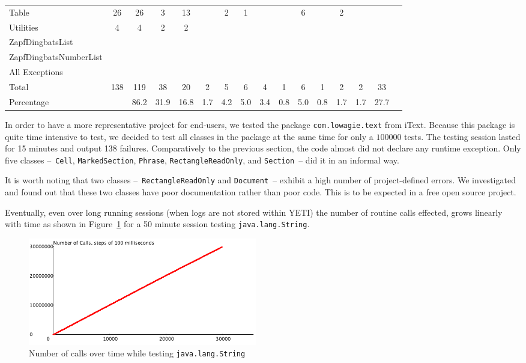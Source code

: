 \begin{table}[h!]
\begin{center}
\begin{tabular}{l c c c c c c c c c c c c c c c}
Table &26&26&3&13&&2&1&&&6&&2&&\\
Utilities &4&4&2&2&&&&&&&&&&\\
ZapfDingbatsList &&&&&&&&&&&&&&\\
ZapfDingbatsNumberList&&&&&&&&&&&&&&\\
All Exceptions&&&&&&&&&&&&&&\\
\hline
Total&138&119&38&20&2&5&6&4&1&6&1&2&2&33\\
\hline
Percentage&&86.2&31.9&16.8&1.7&4.2&5.0&3.4&0.8&5.0&0.8&1.7&1.7&27.7\\
\hline
\end{tabular}
\end{center}
\end{table}

In order to have a more representative project for end-users, we tested the package \texttt{com.lowagie.text} from iText. Because this package is quite time intensive to test, we decided to test all classes in the package at the same time for only a $100000$ tests. The testing session lasted for 15 minutes and output 138 failures. Comparatively to the previous section, the code almost did not declare any runtime exception. Only five classes --~\texttt{Cell}, \texttt{MarkedSection}, \texttt{Phrase}, \texttt{RectangleReadOnly}, and \texttt{Section}~-- did it in an informal way. 

It is worth noting that two classes --~\texttt{RectangleReadOnly}  and \texttt{Document}~-- exhibit a high number of project-defined errors. We investigated and found out that these two classes have poor documentation rather than poor code. This is to be expected in a free open source project.

Eventually, even over long running sessions (when logs are not stored within YETI) the number of routine calls effected, grows linearly with time as shown in Figure~\ref{fig:string} for a 50 minute session testing \texttt{java.lang.String}.

\begin{figure}[h!]
\begin{center}
\includegraphics[width=10cm]{images/Ncalls.png}
\end{center}
\caption{Number of calls over time while testing \texttt{java.lang.String}}\label{fig:string}
\end{figure}

